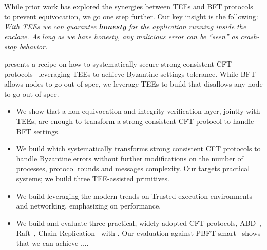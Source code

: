 \fi
{}
 While prior work has explored the synergies between TEEs and BFT protocols~\cite{A2M, minBFT} to prevent equivocation, we go one step further. Our key insight is the following: \emph{With TEEs we can guarantee \textbf{honesty} for the application running inside the enclave. As long as we have honesty, any malicious error can be ``seen'' as crash-stop behavior.}

 \projecttitle{} presents a recipe on how to systematically secure strong consistent CFT protocols~\cite{f04eb9b864204bab958e72055062748c} leveraging TEEs to achieve Byzantine settings tolerance. While BFT allows nodes to go out of spec, we leverage TEEs to build \projecttitle{} that disallows any node to go out of spec.

\begin{itemize}
    \item We show that a non-equivocation and integrity verification layer, jointly with TEEs, are enough to transform a strong consistent CFT protocol to handle BFT settings. 
    \item We build \projecttitle{} which systematically transforms strong consistent CFT protocols to handle Byzantine errors without further modifications on the number of processes, protocol rounds and messages complexity. Our \projecttitle{} targets practical systems; we build three TEE-assisted primitives.
    \item We build \projecttitle{} leveraging the modern trends on Trusted execution environments and networking, emphasizing on performance.
    \item We build and evaluate three practical, widely adopted CFT protocols, ABD~\cite{}, Raft~\cite{raft}, Chain Replication~\cite{chain-replication} with \projecttitle{}. Our evaluation against PBFT-smart~\cite{bft-smart} shows that we can achieve ....
\end{itemize}
\fi